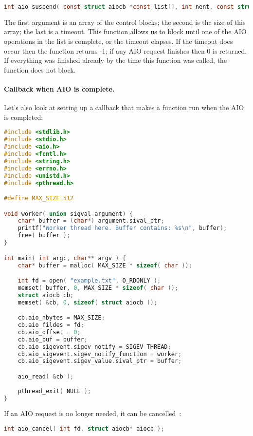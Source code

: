 \begin{lstlisting}[language=C]
int aio_suspend( const struct aiocb *const list[], int nent, const struct timespec* timeout );
\end{lstlisting}

The first argument is an array of the control blocks; the second is the size of this array; the last is a timeout. This function allows us to block until one of the AIO operations in the list is complete, or the timeout elapses. If the timeout does occur then the function returns -1; if any AIO request finishes then 0 is returned. If everything was finished already by the time this function was called, the function does not block.

\paragraph{Callback when AIO is complete.} Let's also look at setting up a callback that makes a function run when the AIO is completed:

\begin{lstlisting}[language=C]
#include <stdlib.h>
#include <stdio.h>
#include <aio.h>
#include <fcntl.h>
#include <string.h>
#include <errno.h>
#include <unistd.h>
#include <pthread.h>

#define MAX_SIZE 512

void worker( union sigval argument) {
    char* buffer = (char*) argument.sival_ptr;
    printf("Worker thread here. Buffer contains: %s\n", buffer);
    free( buffer );
}

int main( int argc, char** argv ) {
    char* buffer = malloc( MAX_SIZE * sizeof( char ));

    int fd = open( "example.txt", O_RDONLY );
    memset( buffer, 0, MAX_SIZE * sizeof( char ));
    struct aiocb cb;
    memset( &cb, 0, sizeof( struct aiocb ));

    cb.aio_nbytes = MAX_SIZE;
    cb.aio_fildes = fd;
    cb.aio_offset = 0;
    cb.aio_buf = buffer;
    cb.aio_sigevent.sigev_notify = SIGEV_THREAD;
    cb.aio_sigevent.sigev_notify_function = worker;
    cb.aio_sigevent.sigev_value.sival_ptr = buffer;

    aio_read( &cb );
    
    pthread_exit( NULL );
}
\end{lstlisting}


If an AIO request is no longer needed, it can be cancelled~\cite{apunix}:
\begin{lstlisting}[language=C]
int aio_cancel( int fd, struct aiocb* aiocb );
\end{lstlisting}

